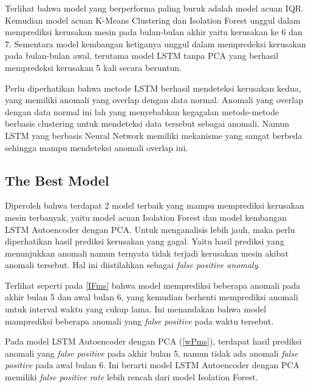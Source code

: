     Terlihat bahwa model yang berperforma paling buruk adalah model acuan IQR. Kemudian model acuan K-Means Clustering dan Isolation Forest unggul dalam memprediksi kerusakan mesin pada bulan-bulan akhir yaitu kerusakan ke 6 dan 7. Sementara model kembangan ketiganya unggul dalam mempredeksi kerusakan pada bulan-bulan awal, terutama model LSTM tanpa PCA yang berhasil mempredeksi kerusakan 5 kali secara beruntun.

    Perlu diperhatikan bahwa metode LSTM berhasil mendeteksi kerusakan kedua, yang memiliki anomali yang overlap dengan data normal. Anomali yang overlap dengan data normal ini lah yang menyebabkan kegagalan metode-metode berbasis clustering untuk mendeteksi data tersebut sebagai anomali. Namun LSTM yang berbasis Neural Network memiliki mekanisme yang sangat berbeda sehingga mampu mendeteksi anomali overlap ini.

    \subsection{The Best Model}

    Diperoleh bahwa terdapat 2 model terbaik yang mampu memprediksi kerusakan mesin terbanyak, yaitu model acuan Isolation Forest dan model kembangan LSTM Autoencoder dengan PCA. Untuk menganalisis lebih jauh, maka perlu diperhatikan hasil prediksi kerusakan yang gagal. Yaitu hasil prediksi yang menunjukkan anomali namun ternyata tidak terjadi kerusakan mesin akibat anomali tersebut. Hal ini diistilahkan sebagai \emph{false positive anomaly}.

    Terlihat seperti pada \ref{IFms} bahwa model memprediksi beberapa anomali pada akhir bulan 5 dan awal bulan 6, yang kemudian berhenti memprediksi anomali untuk interval waktu yang cukup lama. Ini menandakan bahwa model mamprediksi beberapa anomali yang \emph{false positive} pada waktu tersebut.

    Pada model LSTM Autoencoder dengan PCA (\ref{wPms}), terdapat hasil prediksi anomali yang \emph{false positive} pada akhir bulan 5, namun tidak ada anomali \emph{false positive} pada awal bulan 6. Ini berarti model LSTM Autoencoder dengan PCA memiliki \emph{false positive rate} lebih rencah dari model Isolation Forest.